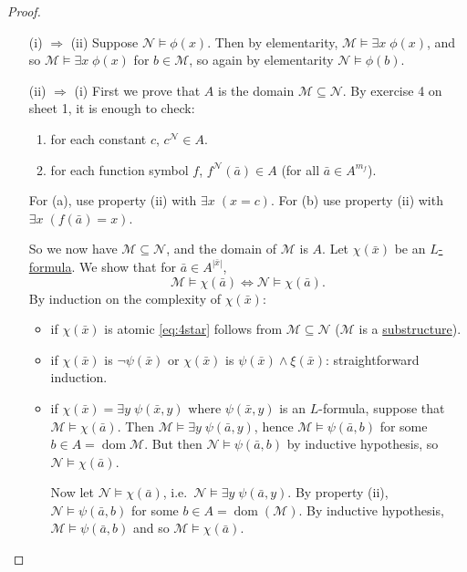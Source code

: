 \documentclass{article}
\let\models\vDash
\DeclareMathOperator{\dom}{dom}
\begin{document}
\begin{proof}\leavevmode
  \begin{itemize}
    \item [(i) $\Rightarrow$ (ii)] Suppose $\mathcal{N} \models \phi(x)$.
      Then by elementarity, $\mathcal{M} \models \exists x \; \phi(x)$, and so $\mathcal{M} \models \exists x \; \phi(x)$ for $b \in \mathcal{M}$, so again by elementarity $\mathcal{N} \models \phi(b)$.
    \item [(ii) $\Rightarrow$ (i)] First we prove that $A$ is the domain $\mathcal{M} \subseteq \mathcal{N}$.
      By exercise 4 on sheet 1, it is enough to check:
      \begin{enumerate}[label=(\alph*)]
        \item for each constant $c$, $c^\mathcal{N} \in A$.
        \item for each function symbol $f$, $f^{\mathcal{N}}(\bar{a}) \in A$ (for all $\bar{a} \in A^{m_f}$).
      \end{enumerate}
      For (a), use property (ii) with $\exists x\; (x = c)$. For (b) use property (ii) with $\exists x\; (f(\bar{a}) = x)$.

      So we now have $\mathcal{M} \subseteq \mathcal{N}$, and the domain of $\mathcal{M}$ is $A$.
      Let $\chi(\bar{x})$ be an \hyperlink{def:form}{$L$-formula}.
      We show that for $\bar{a} \in A^{|\bar{x}|}$,
      \begin{equation*}
        \mathcal{M} \models \chi(\bar{a}) \iff \mathcal{N} \models \chi(\bar{a}). \tag{$*$} \label{eq:4star}
      \end{equation*}
      By induction on the complexity of $\chi(\bar{x})$:
      \begin{itemize}[label=--]
        \item if $\chi(\bar{x})$ is atomic \eqref{eq:4star} follows from $\mathcal{M} \subseteq \mathcal{N}$ ($\mathcal{M}$ is a \hyperlink{def:subs}{substructure}).
        \item if $\chi(\bar{x})$ is $\neg \psi(\bar{x})$ or $\chi(\bar{x})$ is $\psi(\bar{x}) \wedge \xi(\bar{x})$: straightforward induction.
        \item if $\chi(\bar{x}) = \exists y \; \psi(\bar{x},y)$ where $\psi(\bar{x},y)$ is an $L$-formula, suppose that $\mathcal{M} \models \chi(\bar{a})$.
          Then $\mathcal{M} \models \exists y \; \psi(\bar{a}, y)$, hence $\mathcal{M} \models \psi(\bar{a},b)$ for some $b \in A = \dom \mathcal{M}$.
          But then $\mathcal{N} \models \psi(\bar{a},b)$ by inductive hypothesis, so $\mathcal{N} \models \chi(\bar{a})$.

          Now let $\mathcal{N} \models \chi(\bar{a})$, i.e.\ $\mathcal{N} \models \exists y \; \psi(\bar{a},y)$.
          By property (ii), $\mathcal{N} \models \psi(\bar{a},b)$ for some $b \in A = \dom(\mathcal{M})$.
          By inductive hypothesis, $\mathcal{M} \models \psi(\bar{a},b)$ and so $\mathcal{M} \models \chi(\bar{a})$. \qedhere
      \end{itemize}
  \end{itemize}
\end{proof}
\end{document}
